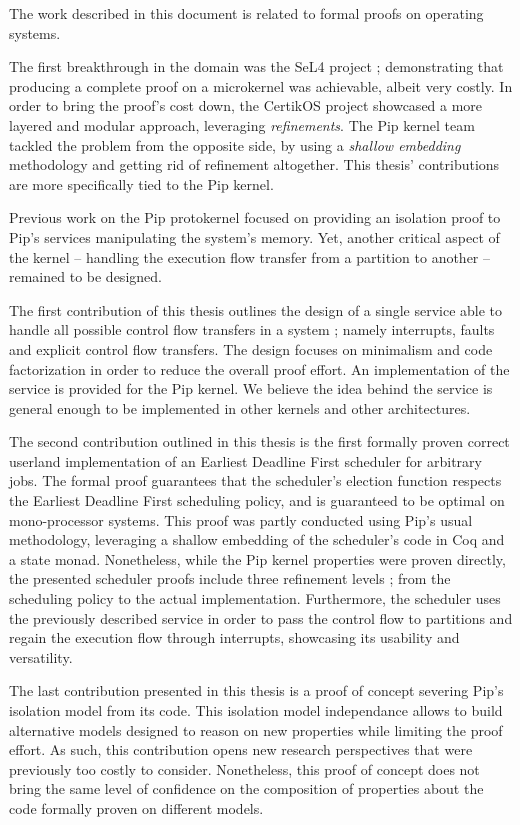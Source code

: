 The work described in this document is related to formal proofs on operating systems.

The first breakthrough in the domain was the SeL4 project ; demonstrating that producing a complete proof on a microkernel was achievable, albeit very costly. 
In order to bring the proof's cost down, the CertikOS project showcased a more layered and modular approach, leveraging \emph{refinements}.
The Pip kernel team tackled the problem from the opposite side, by using a \emph{shallow embedding} methodology and getting rid of refinement altogether. This thesis' contributions are more specifically tied to the Pip kernel.

Previous work on the Pip protokernel focused on providing an isolation proof to Pip's services manipulating the system's memory. Yet, another critical aspect of the kernel -- handling the execution flow transfer from a partition to another -- remained to be designed.

The first contribution of this thesis outlines the design of a single service able to handle all possible control flow transfers in a system ; namely interrupts, faults and explicit control flow transfers. The design focuses on minimalism and code factorization in order to reduce the overall proof effort. An implementation of the service is provided for the Pip kernel. We believe the idea behind the service is general enough to be implemented in other kernels and other architectures.

The second contribution outlined in this thesis is the first formally proven correct userland implementation of an Earliest Deadline First scheduler for arbitrary jobs. The formal proof guarantees that the scheduler's election function respects the Earliest Deadline First scheduling policy, and is guaranteed to be optimal on mono-processor systems. This proof was partly conducted using Pip's usual methodology, leveraging a shallow embedding of the scheduler's code in Coq and a state monad. Nonetheless, while the Pip kernel properties were proven directly, the presented scheduler proofs include three refinement levels ; from the scheduling policy to the actual implementation. Furthermore, the scheduler uses the previously described service in order to pass the control flow to partitions and regain the execution flow through interrupts, showcasing its usability and versatility.

The last contribution presented in this thesis is a proof of concept severing Pip's isolation model from its code. This isolation model independance allows to build alternative models designed to reason on new properties while limiting the proof effort. As such, this contribution opens new research perspectives that were previously too costly to consider. Nonetheless, this proof of concept does not bring the same level of confidence on the composition of properties about the code formally proven on different models.

